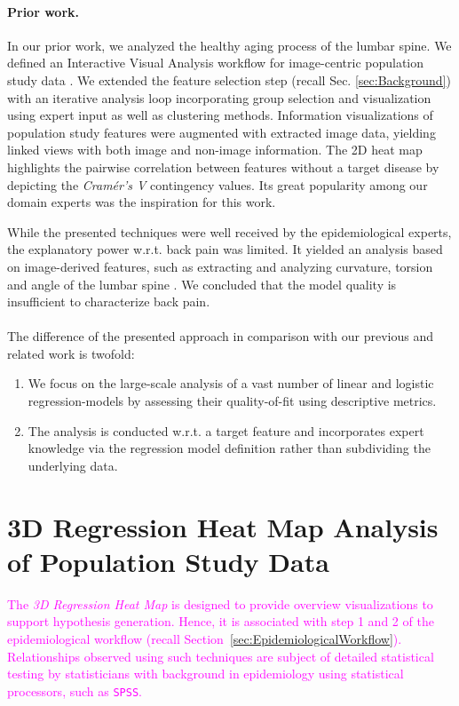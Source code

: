 \documentclass[journal]{style/vgtc} 			          %
\newcommand{\design}[1]{\textcolor{orange}{#1}}
\newcommand{\magenta}[1]{\textcolor{magenta}{#1}}
\begin{document}
\paragraph{Prior work.}
In our prior work, we analyzed the healthy aging process of the lumbar spine.
We defined an Interactive Visual Analysis workflow for image-centric population study data \cite{Klemm2014VIS}.
We extended the feature selection step (recall Sec. \ref{sec:Background}) with an iterative analysis loop incorporating group selection and visualization using expert input as well as clustering methods.
Information visualizations of population study features were augmented with extracted image data, yielding linked views with both image and non-image information.
The 2D heat map \cite{Klemm2014VIS} highlights the pairwise correlation between features without a target disease by depicting the \emph{Cram\'{e}r's V} contingency values.
Its great popularity among our domain experts was the inspiration for this work.

While the presented techniques were well received by the epidemiological experts, the explanatory power w.r.t. back pain was limited.
It yielded an analysis based on image-derived features, such as extracting and analyzing curvature, torsion and angle of the lumbar spine \cite{Klemm2015}.
We concluded that the model quality is insufficient to characterize back pain.
\\\\
The difference of the presented approach in comparison with our previous and related work is twofold:
\begin{enumerate}
	\item We focus on the large-scale analysis of a vast number of linear and logistic regression-models by assessing their quality-of-fit using descriptive metrics.
	\item The analysis is conducted w.r.t. a target feature and incorporates expert knowledge via the regression model definition rather than subdividing the underlying data.
\end{enumerate}
\section{3D Regression Heat Map Analysis of Population Study Data}
\magenta{
The \emph{3D Regression Heat Map} is designed to provide overview visualizations to support hypothesis generation.
Hence, it is associated with step 1 and 2 of the epidemiological workflow (recall Section~\ref{sec:EpidemiologicalWorkflow}).
Relationships observed using such techniques are subject of detailed statistical testing by statisticians with background in epidemiology using statistical processors, such as \texttt{SPSS}.
}
\end{document}
